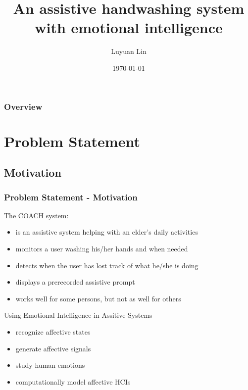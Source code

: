 \documentclass{beamer}
\title[Master Thesis Presentation]{An assistive handwashing system with emotional intelligence}
\author{Luyuan Lin} %
\institute[UWaterloo] %
{
University of Waterloo \\ %
\medskip
\textit{Supervisor:
\newline Jesse Hoey
} %
}
\date{\today} %
\begin{document}
\begin{frame}
\titlepage %
\end{frame}

\begin{frame}
\frametitle{Overview} %
\tableofcontents %
\end{frame}


\section{Problem Statement} 
\subsection{Motivation}
\begin{frame}
\frametitle{Problem Statement - Motivation}
The COACH system:
\begin{itemize}
\item is an assistive system helping with an elder's daily activities
\item monitors a user washing his/her hands and when needed
\item detects when the user has lost track of what he/she is doing
\item displays a prerecorded assistive prompt
\item works well for some persons, but not as well for others
\end{itemize}
\pause
Using Emotional Intelligence in Assitive Systems
\begin{itemize}
\item recognize affective states
\item generate affective signals
\item study human emotions
\item computationally model affective HCIs
\end{itemize}
\end{frame}
\end{document}
